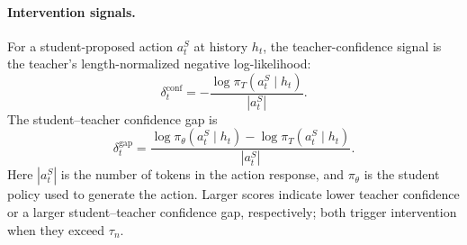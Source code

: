 \paragraph{Intervention signals.}
For a student-proposed action $a_t^S$ at history $h_t$, the teacher-confidence
signal is the teacher's length-normalized negative log-likelihood:
\[
\delta_t^{\mathrm{conf}}
=-\frac{\log\pi_T(a_t^S\mid h_t)}{|a_t^S|}.
\]
The student--teacher confidence gap is
\[
\delta_t^{\mathrm{gap}}
=\frac{\log\pi_\theta(a_t^S\mid h_t)-\log\pi_T(a_t^S\mid h_t)}{|a_t^S|}.
\]
Here $|a_t^S|$ is the number of tokens in the action response, and
$\pi_\theta$ is the student policy used to generate the action.
Larger scores indicate lower teacher confidence or a larger student--teacher
confidence gap, respectively; both trigger intervention when they exceed
$\tau_n$.

